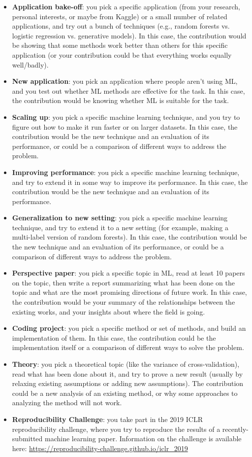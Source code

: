 \documentclass{article}
\def\items#1{\begin{itemize}#1\end{itemize}}
\begin{document}
\items{
\item \textbf{Application bake-off}: you pick a specific application (from your research, personal interests, or maybe from Kaggle) or a small number of related applications, and try out a bunch of techniques (e.g., random forests vs. logistic regression vs. generative models). In this case, the contribution would be showing that some methods work better than others for this specific application (or your contribution could be that everything works equally well/badly).
\item \textbf{New application}: you pick an application where people aren't using ML, and you test out whether ML methods are effective for the task. In this case, the contribution would be knowing whether ML is suitable for the task.
\item \textbf{Scaling up}: you pick a specific machine learning technique, and you try to figure out how to make it run faster or on larger datasets. In this case, the contribution would be the new technique and an evaluation of its performance, or could be a comparison of different ways to address the problem.
\item \textbf{Improving performance}: you pick a specific machine learning technique, and try to extend it in some way to improve its performance. In this case, the contribution would be the new technique and an evaluation of its performance.
\item \textbf{Generalization to new setting}: you pick a specific machine learning technique, and try to extend it to a new setting (for example, making a multi-label version of random forests).  In this case, the contribution would be the new technique and an evaluation of its performance, or could be a comparison of different ways to address the problem.
\item \textbf{Perspective paper}: you pick a specific topic in ML, read at least 10 papers on the topic, then write a report summarizing what has been done on the topic and what are the most promising directions of future work. In this case, the contribution would be your summary of the relationships between the existing works, and your insights about where the field is going.
\item \textbf{Coding project}: you pick a specific method or set of methods, and build an implementation of them. In this case, the contribution could be the implementation itself or a comparison of different ways to solve the problem.
\item \textbf{Theory}: you pick a theoretical topic (like the variance of cross-validation), read what has been done about it, and try to prove a new result (usually by relaxing existing assumptions or adding new assumptions). The contribution could be a new analysis of an existing method, or why some approaches to analyzing the method will not work.
\item \textbf{Reproducibility Challenge}: you take part in the 2019 ICLR reproducibility challenge, where you try to reproduce the results of a recently-submitted machine learning paper. Information on the challenge is available here: \url{https://reproducibility-challenge.github.io/iclr_2019}
}
\end{document}
